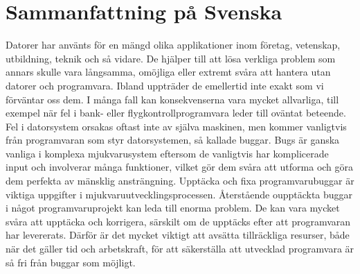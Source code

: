 \chapter*{Sammanfattning på Svenska \texorpdfstring{\hfill{}}{}}

Datorer har använts för en mängd olika applikationer inom företag, vetenskap, utbildning, teknik och så vidare. De hjälper till att lösa verkliga problem som annars skulle vara långsamma, omöjliga eller extremt svåra att hantera utan datorer och programvara. Ibland uppträder de emellertid inte exakt som vi förväntar oss dem. I många fall kan konsekvenserna vara mycket allvarliga, till exempel när fel i bank- eller flygkontrollprogramvara leder till oväntat beteende. Fel i datorsystem orsakas oftast inte av själva maskinen, men kommer vanligtvis från programvaran som styr datorsystemen, så kallade buggar. Bugs är ganska vanliga i komplexa mjukvarusystem eftersom de vanligtvis har komplicerade input och involverar många funktioner, vilket gör dem svåra att utforma och göra dem perfekta av mänsklig ansträngning. Upptäcka och fixa programvarubuggar är viktiga uppgifter i mjukvaruutvecklingsprocessen. Återstående oupptäckta buggar i något programvaruprojekt kan leda till enorma problem. De kan vara mycket svåra att upptäcka och korrigera, särskilt om de upptäcks efter att programvaran har levererats. Därför är det mycket viktigt att avsätta tillräckliga resurser, både när det gäller tid och arbetskraft, för att säkerställa att utvecklad programvara är så fri från buggar som möjligt.



